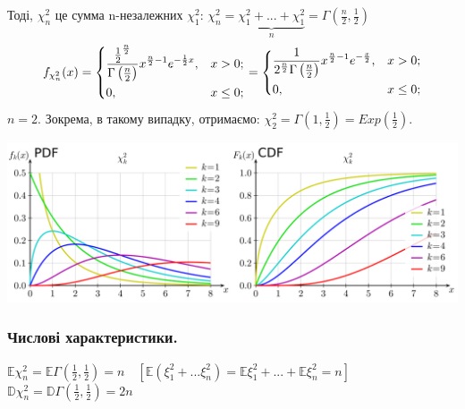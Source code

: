 Тоді, $\chi^2_n$ це сумма n-незалежних $\chi_1^2$: $\chi^2_n = \underbrace{\chi_1^2 + ... + \chi_1^2}_{n} = \Gamma \left(  \frac{n}{2}, \frac{1}{2} \right)  $
$$
f_{
\chi_n^2
} (x) = \begin{dcases}
 \frac{ \frac{1}{2}^{ \frac{n}{2}  }  }{ \Gamma \left(  \frac{n}{2}  \right) } x^{ \frac{n}{2} -1  } e^{- \frac{1}{2}x }, & x > 0;\\
 0 , & x \leq 0;
\end{dcases}  =
\begin{dcases}
\frac{ 1 }{2^{ \frac{n}{2}  }  \Gamma \left(  \frac{n}{2}  \right) } x^{ \frac{n}{2} -1  } e^{- \frac{x}{2} }, & x > 0;\\
0 , & x \leq 0;
\end{dcases}
$$
$n = 2.$ Зокрема, в такому випадку, отримаємо: $ \chi_2^2 = \Gamma \left( 1, \frac{1}{2}  \right) = Exp \left( \frac{1}{2} \right)  $.
\begin{center}
\includegraphics[scale=0.3]{assets/lectures_part_3-d1334d87.png}
\end{center}
\subsubsection{Числові характеристики.}
$\mathbb{E} \chi^2_n = \mathbb{E} \Gamma \left( \frac{1}{2} , \frac{1}{2}   \right) = n  \quad \left[ \mathbb{E} \left( \xi_1^2 + ... \xi_n^2 \right) = \mathbb{E} \xi_1^2 + ... + \mathbb{E}\xi_n^2 = n \right]$\\
$\mathbb{D} \chi^2_n = \mathbb{D} \Gamma \left( \frac{1}{2} , \frac{1}{2}   \right) = 2n $

